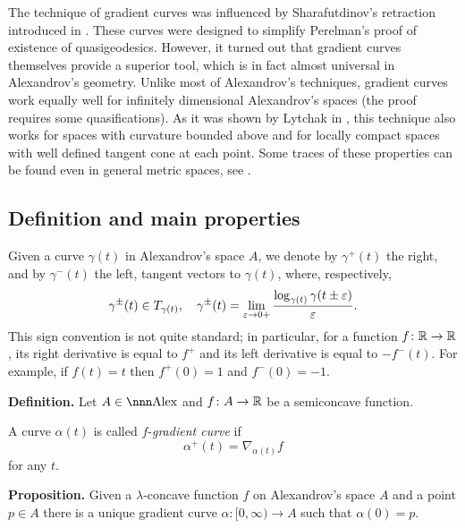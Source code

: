 \documentclass{article}
\begin{document}
The technique of gradient curves was influenced by 
Sharafutdinov's retraction introduced in \cite{sharafutdinov}. 
These curves were designed to simplify Perelman's proof of
existence of quasigeodesics. 
However, it turned out that gradient curves themselves
provide a superior tool, which is in fact almost universal in Alexandrov's
geometry.
Unlike most of Alexandrov's techniques, gradient curves work equally well for
infinitely dimensional Alexandrov's spaces (the proof requires some quasifications). 
As it was shown by Lytchak in \cite{lytchak:open-map},
this technique also works for spaces with curvature bounded above and for locally compact
spaces with well defined tangent cone at each point. 
Some traces of these
properties can be found even in general metric spaces, 
see \cite{grad-flow-book}.











\subsection{Definition and main properties}\label{def-grad-curv}

Given a curve $\gamma(t)$ in Alexandrov's space $A$, we denote by $\gamma^+(t)$ 
the right, and by 
$\gamma^-(t)$ the left, tangent vectors to  $\gamma(t)$, where, respectively,
$$\gamma^\pm(t)\in T_{\gamma(t)},\ \ \ 
\gamma^\pm(t)
=
\lim_{\eps\to 0+}
\frac{\log_{\gamma(t)}\gamma(t\pm\eps)}{\eps}.$$ 
This sign convention is not quite standard; 
in particular, for a function
$f\:\RR\z\to\RR$,  its right derivative is equal to $f^+$ and  its left derivative is equal to $-f^-(t)$.
For example, if $f(t)=t$ then $f^+(0)= 1$ and $f^-(0)= -1$.

\begin{thm}{\bf Definition.} Let $A\in\Alex$ and $f\colon A\to \mathbb{R}$ be a semiconcave
function. 

A curve $\alpha(t)$ is called $f$-\emph{gradient curve} if 
$$\alpha^+(t)=\nabla_{\alpha(t)}f$$
for any $t$.
\end{thm}

\begin{thm}{\bf Proposition.}\label{prop:gradlip} Given a $\lambda$-concave
function $f$ on Alexandrov's space $A$ and a point $p\in A$ there is a unique
gradient curve $\alpha\colon [0,\infty) \rightarrow A$ such that $\alpha(0)=p$. 
\end{thm} 
\end{document}
